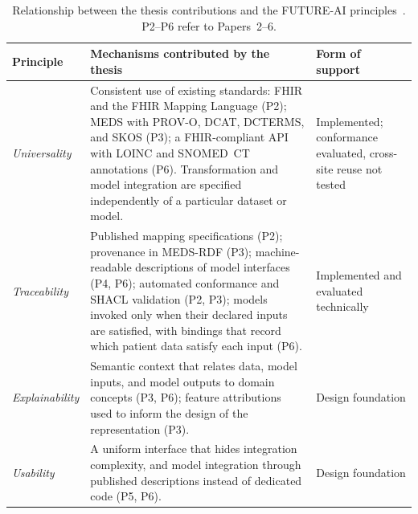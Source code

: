 \begin{table}[htpb]
\caption{Relationship between the thesis contributions and the FUTURE-AI principles~\cite{lekadir_future-ai_2025}. P2--P6 refer to Papers~2--6.}
\label{tab:conclusions_futureai}
\small
\begin{tabularx}{\textwidth}{>{\raggedright\arraybackslash}p{2.4cm} >{\raggedright\arraybackslash}X >{\raggedright\arraybackslash}p{3.4cm}}
\toprule
\textbf{Principle} & \textbf{Mechanisms contributed by the thesis} & \textbf{Form of support} \\
\midrule
\emph{Universality} & Consistent use of existing standards: FHIR and the FHIR Mapping Language (P2); MEDS with PROV-O, DCAT, DCTERMS, and SKOS (P3); a FHIR-compliant API with LOINC and SNOMED~CT annotations (P6). Transformation and model integration are specified independently of a particular dataset or model. & Implemented; conformance evaluated, cross-site reuse not tested \\
\emph{Traceability} & Published mapping specifications (P2); provenance in MEDS-RDF (P3); machine-readable descriptions of model interfaces (P4, P6); automated conformance and SHACL validation (P2, P3); models invoked only when their declared inputs are satisfied, with bindings that record which patient data satisfy each input (P6). & Implemented and evaluated technically \\
\emph{Explainability} & Semantic context that relates data, model inputs, and model outputs to domain concepts (P3, P6); feature attributions used to inform the design of the representation (P3). & Design foundation \\
\emph{Usability} & A uniform interface that hides integration complexity, and model integration through published descriptions instead of dedicated code (P5, P6). & Design foundation \\
\bottomrule
\end{tabularx}
\end{table}


